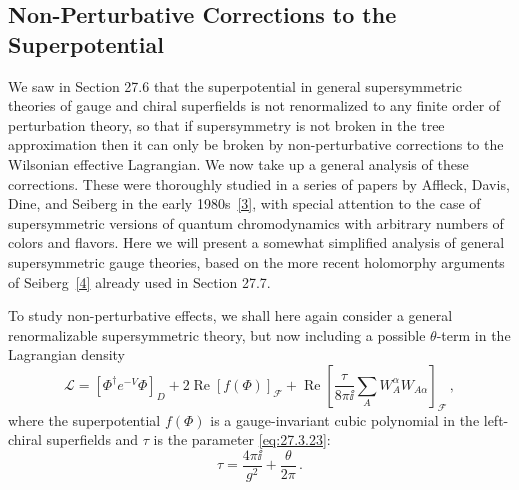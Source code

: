 
\subsection{Non-Perturbative Corrections to the Superpotential}

We saw in Section 27.6 that the superpotential in general supersymmetric
theories of gauge and chiral superfields is not renormalized to any finite
order of perturbation theory, so that if supersymmetry is not broken in the
tree approximation then it can only be broken by non-perturbative
corrections to the Wilsonian effective Lagrangian. We now take up a general
analysis of these corrections. These were thoroughly studied in a series of
papers by Affleck, Davis, Dine, and Seiberg in the early
1980s~\hyperref[ch29-ref-3]{[3]}, with special attention to the case of
supersymmetric versions of quantum chromodynamics with arbitrary numbers
of colors and flavors. Here we will present a somewhat simplified analysis
of general supersymmetric gauge theories, based on the more recent
holomorphy arguments of Seiberg~\hyperref[ch29-ref-4]{[4]} already used in
Section 27.7.

To study non-perturbative effects, we shall here again consider a general
renormalizable supersymmetric theory, but now including a possible
\(\theta\)-term in the Lagrangian density
\begin{equation}
  \mathcal{L}
  =
  \left[\Phi^\dagger e^{-V}\Phi\right]_D
  +2\operatorname{Re}\left[f(\Phi)\right]_{\mathcal{F}}
  +\operatorname{Re}
  \left[
    \frac{\tau}{8\pi \ii}
    \sum_AW_A^\alpha W_{A\alpha}
  \right]_{\mathcal{F}}\,,
  \tag{29.3.1}\label{eq:29.3.1}
\end{equation}
where the superpotential \(f(\Phi)\) is a gauge-invariant cubic polynomial
in the left-chiral superfields and \(\tau\) is the parameter
\eqref{eq:27.3.23}:
\begin{equation}
  \tau=\frac{4\pi \ii}{g^2}+\frac{\theta}{2\pi}\,.
  \tag{29.3.2}\label{eq:29.3.2}
\end{equation}

